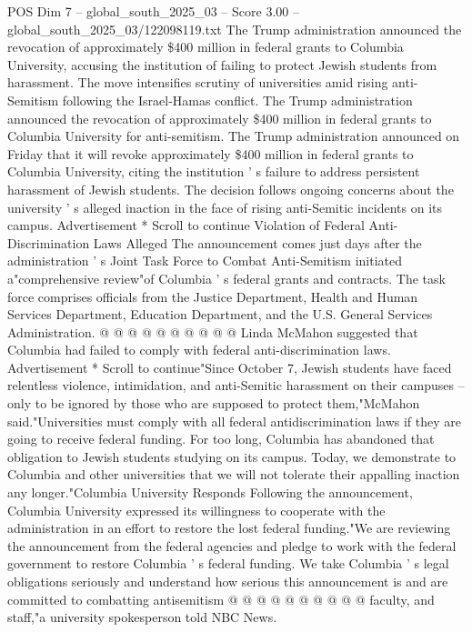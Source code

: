\begin{textsample}{POS Dim 7 – global\_south\_2025\_03 – Score 3.00 – global\_south\_2025\_03/122098119.txt}  \label{ex:f7_pos_428}
The Trump administration announced the revocation of approximately \$400 million in federal grants to Columbia University, accusing the institution of failing to protect Jewish students from harassment.
The move intensifies scrutiny of universities amid rising anti-Semitism following the Israel-Hamas conflict.
The Trump administration announced the revocation of approximately \$400 million in federal grants to Columbia University for anti-semitism.
The Trump administration announced on Friday that it will revoke approximately \$400 million in federal grants to Columbia University, citing the institution ' s failure to address persistent harassment of Jewish students.
The decision follows ongoing concerns about the university ' s alleged inaction in the face of rising anti-Semitic incidents on its campus.
Advertisement * Scroll to continue Violation of Federal Anti-Discrimination Laws Alleged The announcement comes just days after the administration ' s Joint Task Force to Combat Anti-Semitism initiated a"comprehensive review"of Columbia ' s federal grants and contracts.
The task force comprises officials from the Justice Department, Health and Human Services Department, Education Department, and the U.S.
General Services Administration. @ @ @ @ @ @ @ @ @ @ Linda McMahon suggested that Columbia had failed to comply with federal anti-discrimination laws.
Advertisement * Scroll to continue"Since October 7, Jewish students have faced relentless violence, intimidation, and anti-Semitic harassment on their campuses -- only to be ignored by those who are supposed to protect them,"McMahon said."Universities must comply with all federal antidiscrimination laws if they are going to receive federal funding.
For too long, Columbia has abandoned that obligation to Jewish students studying on its campus.
Today, we demonstrate to Columbia and other universities that we will not tolerate their appalling inaction any longer."Columbia University Responds Following the announcement, Columbia University expressed its willingness to cooperate with the administration in an effort to restore the lost federal funding."We are reviewing the announcement from the federal agencies and pledge to work with the federal government to restore Columbia ' s federal funding.
We take Columbia ' s legal obligations seriously and understand how serious this announcement is and are committed to combatting antisemitism @ @ @ @ @ @ @ @ @ @ faculty, and staff,"a university spokesperson told NBC News.

\end{textsample}
